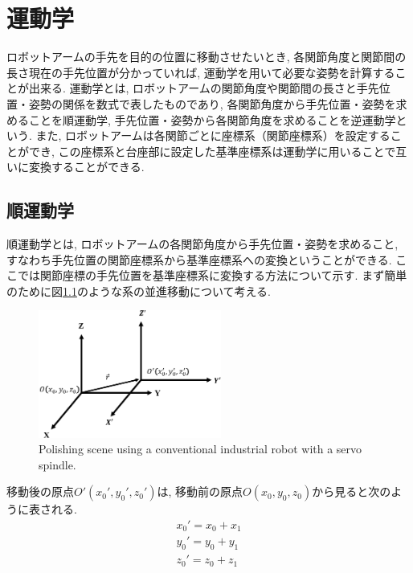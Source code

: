 \documentclass{suribt}
\begin{document}
\chapter{運動学}
ロボットアームの手先を目的の位置に移動させたいとき, 各関節角度と関節間の長さ現在の手先位置が分かっていれば, 運動学を用いて必要な姿勢を計算することが出来る. 運動学とは, ロボットアームの関節角度や関節間の長さと手先位置・姿勢の関係を数式で表したものであり, 各関節角度から手先位置・姿勢を求めることを順運動学, 手先位置・姿勢から各関節角度を求めることを逆運動学という. 
また, ロボットアームは各関節ごとに座標系（関節座標系）を設定することができ, この座標系と台座部に設定した基準座標系は運動学に用いることで互いに変換することができる.

\section{順運動学}
順運動学とは, ロボットアームの各関節角度から手先位置・姿勢を求めること, すなわち手先位置の関節座標系から基準座標系への変換ということができる. ここでは関節座標の手先位置を基準座標系に変換する方法について示す. まず簡単のために図\ref{fig:translation}のような系の並進移動について考える.
\begin{figure}[ht]
 \begin{center}
  \includegraphics[width=60mm,clip]{./figure/translation.eps}
  \caption{Polishing scene using a conventional industrial robot with a servo spindle.}
  \label{fig:translation}
 \end{center}
\end{figure}

移動後の原点$O'(x_0', y_0', z_0')$は, 移動前の原点$O(x_0, y_0, z_0)$から見ると次のように表される.
\begin{eqnarray*}
	x_0' = x_0 + x_1 \\
	y_0' = y_0 + y_1 \\
	z_0' = z_0 + z_1
\end{eqnarray*}
\end{document}
